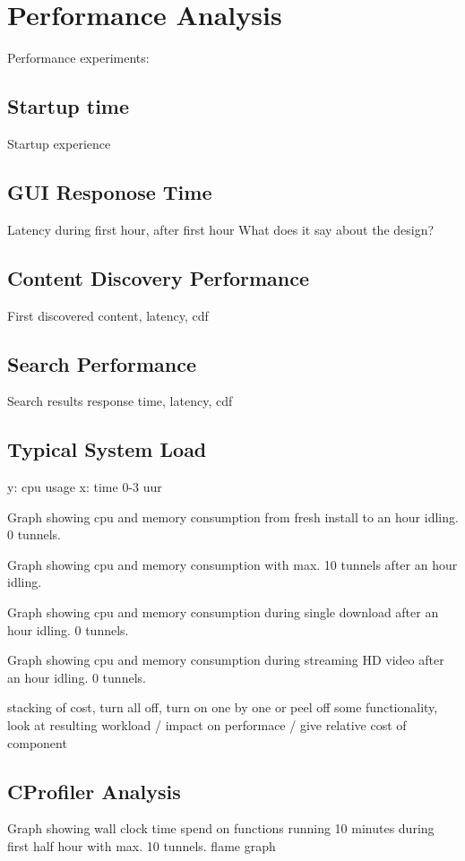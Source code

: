 \chapter{Performance Analysis}
Performance experiments:

\section{Startup time}
Startup experience

\section{GUI Responose Time}
Latency during first hour, after first hour
What does it say about the design?

\section{Content Discovery Performance}
First discovered content, latency, cdf

\section{Search Performance}
Search results response time, latency, cdf





\section{Typical System Load}
y: cpu usage
x: time 0-3 uur

Graph showing cpu and memory consumption from fresh install to an hour idling. 0 tunnels.

Graph showing cpu and memory consumption with max. 10 tunnels after an hour idling.

Graph showing cpu and memory consumption during single download after an hour idling. 0 tunnels.

Graph showing cpu and memory consumption during streaming HD video after an hour idling. 0 tunnels.



stacking of cost, turn all off, turn on one by one or peel off some functionality, look at resulting workload / impact on performace / give relative cost of component

\section{CProfiler Analysis}
Graph showing wall clock time spend on functions running 10 minutes during first half hour with max. 10 tunnels.
flame graph

